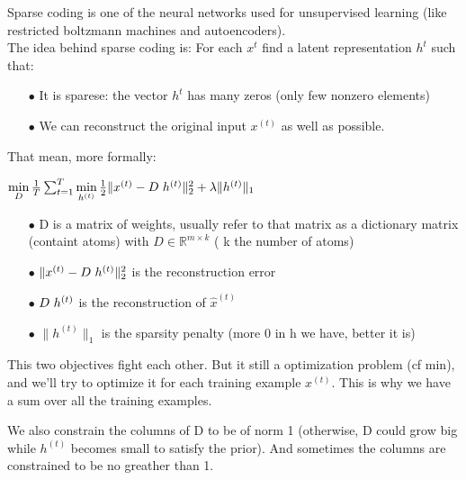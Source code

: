 \documentclass[a4paper,10pt]{article}
\newcommand{\R}{\mathbb{R}}
\begin{document}
Sparse coding is one of the neural networks used for unsupervised learning  (like restricted boltzmann machines and autoencoders).\\
The idea behind sparse coding is: For each $x^{t}$ find a latent representation $h^{t}$ such that:
\begin{itemize}
 \item[$\bullet$] It is sparese: the vector $h^{t}$ has many zeros (only few nonzero elements)
 \item[$\bullet$] We can reconstruct the original input $x^{(t)}$ as well as possible.
\end{itemize}
That mean, more formally:\\

\begin{center}
 $\min\limits_{D} \frac{1}{T} \sum_{t=1}^{T}  \min\limits_{h^{(t)}} \frac{1}{2} \| x^{(t)} - D \hspace{3px} h^{(t)} \|_2^2 + \lambda \|h^{(t)} \|_1$\\
\end{center}

 \begin{itemize}
 \item[$\bullet$] D is a matrix of weights, usually refer to that matrix as a dictionary matrix (containt atoms) with $D \in  \R^{m \times k}$ ( k the number of atoms)
  \item[$\bullet$] $\| x^{(t)} - D \hspace{3px} h^{(t)} \|_2^2 $ is the reconstruction error
  \item[$\bullet$]$ D \hspace{3px} h^{(t)}$ is the reconstruction of $\hat{x}^{(t)}$
  \item[$\bullet$]$\|h^{(t)} \|_1$ is the sparsity penalty (more 0 in h we have, better it is)
 \end{itemize}
This two objectives fight each other. But it still a optimization problem (cf min), and we'll try to optimize it for each training example $x^{(t)}$. This is why we have a sum over all the training examples.
\newline

\indent We also constrain the columns of D to be of norm 1 (otherwise, D could grow big while $h^{(t)}$ becomes small to satisfy the prior). And sometimes the columns are constrained to be no greather than 1.\\
\end{document}
